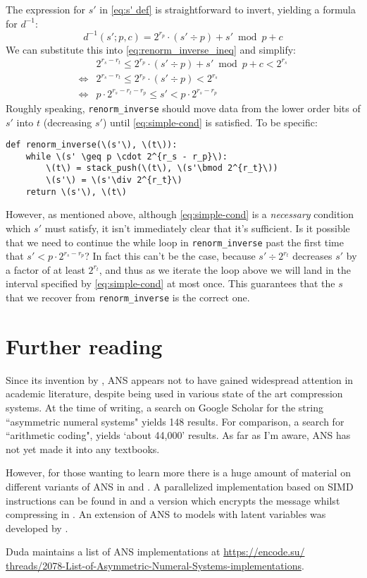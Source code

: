 \documentclass{article}
\begin{document}
The expression for \(s'\) in \cref{eq:s' def} is straightforward to invert,
yielding a formula for
\(d^{-1}\):
\begin{equation}
  d^{-1}(s'; p, c) = 2^{r_p} \cdot (s' \div p) + s' \bmod p + c
\end{equation}
We can substitute this into \cref{eq:renorm_inverse_ineq} and simplify:
\begin{align}
  &2^{r_s - r_t} \leq 2^{r_p} \cdot (s' \div p) + s' \bmod p + c < 2^{r_s}\\
  \iff&2^{r_s - r_t} \leq 2^{r_p} \cdot (s' \div p) < 2^{r_s}\\
  \iff&p\cdot2^{r_s - r_t - r_p}\leq s' < p\cdot 2^{r_s -
  r_p}\label{eq:simple-cond}
\end{align}
Roughly speaking, \texttt{renorm\_inverse} should move data from the lower
order bits of \(s'\) into \(t\) (decreasing \(s'\)) until \cref{eq:simple-cond}
is satisfied. To be specific:

\begin{lstlisting}
def renorm_inverse(\(s'\), \(t\)):
    while \(s' \geq p \cdot 2^{r_s - r_p}\):
        \(t\) = stack_push(\(t\), \(s'\bmod 2^{r_t}\))
        \(s'\) = \(s'\div 2^{r_t}\)
    return \(s'\), \(t\)
\end{lstlisting}

However, as mentioned above, although \cref{eq:simple-cond} is a
\emph{necessary} condition which \(s'\) must satisfy, it isn't immediately
clear that it's sufficient. Is it possible that we need to continue the while
loop in \texttt{renorm\_inverse} past the first time that \(s'<p\cdot2^{r_s -
r_p}\)? In fact this can't be the case, because \(s'\div2^{r_t}\) decreases
\(s'\) by a factor of at least \(2^{r_t}\), and thus as we iterate the loop
above we will land in the interval specified by \cref{eq:simple-cond} at most
once. This guarantees that the \(s\) that we recover from
\texttt{renorm\_inverse} is the correct one.

\section{Further reading}
Since its invention by \citet{duda2009}, ANS appears not to have gained
widespread attention in academic literature, despite being used in various
state of the art compression systems. At the time of writing, a search on
Google Scholar for the string ``asymmetric numeral systems" yields 148 results.
For comparison, a search for ``arithmetic coding", yields `about 44,000'
results. As far as I'm aware, ANS has not yet made it into any textbooks.

However, for those wanting to learn more there is a huge amount of material on
different variants of ANS in \citet{duda2009} and \citet{duda2015}. A
parallelized implementation based on SIMD instructions can be found in
\citet{giesen2014} and a version which encrypts the message whilst compressing
in \citet{duda2016}.  An extension of ANS to models with latent variables was
developed by \citet{townsend2019}.

Duda maintains a list of ANS implementations at
\url{
  https://encode.su/
  threads/2078-List-of-Asymmetric-Numeral-Systems-implementations}.
\printbibliography
\end{document}
